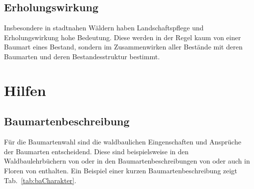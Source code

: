 \documentclass[twocolumn]{scrartcl}
\begin{document}
\subsection{Erholungswirkung}
\label{ssec:erholung}

Insbesondere in stadtnahen Wäldern haben Landschaftspflege und
Erholungswirkung hohe Bedeutung. Diese werden in der Regel kaum von
einer Baumart eines Bestand, sondern im Zusammenwirken aller Bestände
mit deren Baumarten und deren Bestandesstruktur bestimmt.

\section{Hilfen}
\label{sec:hilfen}

\subsection{Baumartenbeschreibung}
\label{sec:baBeschreibung}

Für die Baumartenwahl sind die waldbaulichen Eingenschaften und
Ansprüche der Baumarten entscheidend. Diese sind beispielsweise in den
Waldbaulehrbüchern von
\citet{mayer1992Waldbau,burschel2003Waldbau,Dengler2020Waldbau,tschermak1950Waldbau,rittershofer2006Waldbau,rubner1960Waldbau,koestler1950Waldbau,bauer1962WaldbauAlsWissenschaft}
oder in den Baumartenbeschreibungen von
\citet{eth2002MitteleuropaeischeWaldbaumarten,leibundgut1984Waldbaeume,ec2016baumartenatlas,hieke1989Dendrologie,mayr1906FremdlaendischeWaldUndParkbaeumeFuerEuropa,stimm2014EnyklopedieDerHolzgewaechse,schuett1993LexikonDerForstbotanik,fva2021Artensteckbrief}
oder auch in Floren von
\citet{fischer2008Exkursionsflora,hegi1906IllustrierteFloraBd1,oberdorfer2001Exkursionsflora,rothmaler2021Exkursionsflora,schmeil2019Exkursionsflora,fitschen2017Gehoelzflora}
enthalten. Ein Beispiel einer kurzen Baumartenbeschreibung zeigt
Tab.~\ref{tab:baCharakter}.
\end{document}
